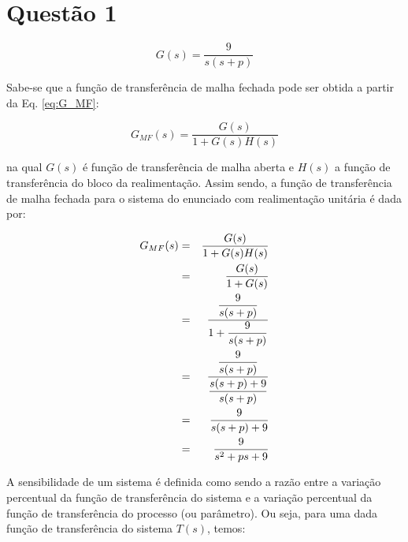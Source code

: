 \section*{Questão 1}

\begin{equation}\nonumber
G(s) = \frac{9}{s(s+p)}
\end{equation}


\vspace{0.5cm}


\vspace{0.25cm}

\noindent Sabe-se que a função de transferência de malha fechada pode ser obtida
a partir da Eq. \ref{eq:G_MF}:

\begin{equation}\label{eq:G_MF}
G_{MF}(s) = \frac{G(s)}{1+G(s)H(s)}
\end{equation}

\noindent na qual $G(s)$ é função de transferência de malha aberta e $H(s)$ a
função de transferência do bloco da realimentação. Assim sendo, a função de
transferência de malha fechada para o sistema do enunciado com realimentação
unitária é dada por:

\begin{eqnarray}
G_{MF}(s) & = & \frac{G(s)}{1+G(s)H(s)}\nonumber\\
          & = & \frac{G(s)}{1+G(s)}\nonumber\\
          & = & \frac{\displaystyle\frac{9}{s(s+p)}}{1+\displaystyle\frac{9}{s(s+p)}}\nonumber\\
          & = & \frac{\displaystyle\frac{9}{s(s+p)}}{\displaystyle\frac{s(s+p)+9}{s(s+p)}}\nonumber\\
          & = & \frac{9}{s(s+p)+9}\nonumber\\
          & = & \frac{9}{s^2 + ps + 9}\label{eq:G_MF_q1}
\end{eqnarray}

A sensibilidade de um sistema é definida como sendo a razão entre a variação
percentual da função de transferência do sistema e a variação percentual da
função de transferência do processo (ou parâmetro). Ou seja, para uma dada
função de transferência do sistema $T(s)$, temos:

